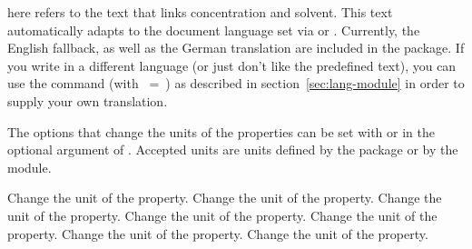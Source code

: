 \documentclass{chemmacros-manual}
\begin{document}
 here refers to the text that links concentration and solvent. This text 
automatically adapts to the document language set via   or . 
Currently, the  English fallback, as well as the German translation are included in the package. 
If you write in a different language (or just don't like the predefined text), you can use 
the command  
(with ~=~) as described in section~\vref{sec:lang-module} in order 
to supply your own translation.

\begin{example}
  
  \par
  \par
\end{example}

The options that change the units of the properties can be set with
 or in the optional argument of . Accepted units
are units defined by the  package or by the  module.
\begin{options}
    Change the unit of the  property.
    Change the unit of the  property.
    Change the unit of the  property.
    Change the unit of the  property.
    Change the unit of the  property.
    Change the unit of the  property.
    Change the unit of the  property.
\end{options} 

\begin{example}
   \par
\end{example}
\end{document}
